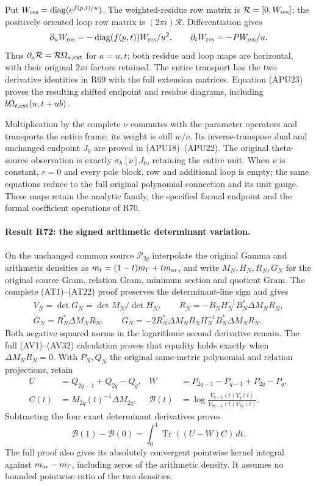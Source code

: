 Put \(W_{\rm res}=\operatorname{diag}(e^{f(p,t)/u})\).
The weighted-residue row matrix is \(\mathcal R=[0,W_{\rm res}]\);
the positively oriented loop row matrix is \((2\pi i)\mathcal R\).
Differentiation gives
\[
 \partial_u W_{\rm res}
    =-\operatorname{diag}(f(p,t))W_{\rm res}/u^2,\qquad
 \partial_t W_{\rm res}=-PW_{\rm res}/u.
\]
Thus \(\partial_a\mathcal R=\mathcal R\Omega_{a,\rm ext}\)
for \(a=u,t\); both residue and loop maps are horizontal, with
their original \(2\pi i\) factors retained. The entire transport
has the two derivative identities in R69 with the full extension
matrices. Equation (APU23) proves the resulting shifted endpoint
and residue diagrams, including
\(b\Omega_{t,\rm ext}(u,t+ub)\).

Multiplication by the complete \(\nu\) commutes with the
parameter operators and transports the entire frame; its weight
is still \(w/\nu\). Its inverse-transpose dual and unchanged
endpoint \(J_0\) are proved in (APU18)--(APU22).
The original theta-source observation is exactly
\(\sigma_h[\nu]J_0\), retaining the entire unit.
When \(\nu\) is constant, \(r=0\) and every pole block, row
and additional loop is empty; the same equations reduce to the
full original polynomial connection and its unit gauge.
These maps retain the analytic family, the specified formal
endpoint and the formal coefficient operations of R70.

\paragraph{Result R72: the signed arithmetic determinant variation.}
On the unchanged common source $\mathcal P_{2q}$ interpolate
the original Gamma and arithmetic densities as
$m_t=(1-t)m_\Gamma+tm_{\rm ar}$, and write $M_N,H_N,R_N,G_N$
for the original source Gram, relation Gram, minimum section
and quotient Gram. The complete (AT1)--(AT22) proof preserves
the determinant-line sign and gives
\[
\begin{gathered}
V_N=\det G_N=\det M_N/\det H_N,\qquad
\dot R_N=-B_NH_N^{-1}B_N^*\Delta M_NR_N,\\
\dot G_N=R_N^*\Delta M_NR_N,\qquad
\ddot G_N=-2R_N^*\Delta M_NB_NH_N^{-1}B_N^*\Delta M_NR_N.
\end{gathered}
\]
Both negative squared norms in the logarithmic second
derivative remain. The full (AV1)--(AV32) calculation proves
that equality holds exactly when $\Delta M_NR_N=0$.
With $P_N,Q_N$ the original same-metric polynomial and
relation projections, retain
\[
\begin{aligned}
U&=Q_{2q-1}+Q_{2q}-Q_q,&
W&=P_{2q-1}-P_{q-1}+P_{2q}-P_q,\\
C(t)&=M_{2q}(t)^{-1}\Delta M_{2q},&
\mathcal B(t)&=\log\frac{V_{q-1}(t)V_q(t)}{V_{2q-1}(t)V_{2q}(t)}.
\end{aligned}
\]
Subtracting the four exact determinant derivatives proves
\[
\mathcal B(1)-\mathcal B(0)=\int_0^1\operatorname{Tr}((U-W)C)\,dt.
\]
The full proof also gives its absolutely convergent
pointwise kernel integral against $m_{\rm ar}-m_\Gamma$,
including zeros of the arithmetic density. It assumes
no bounded pointwise ratio of the two densities.


